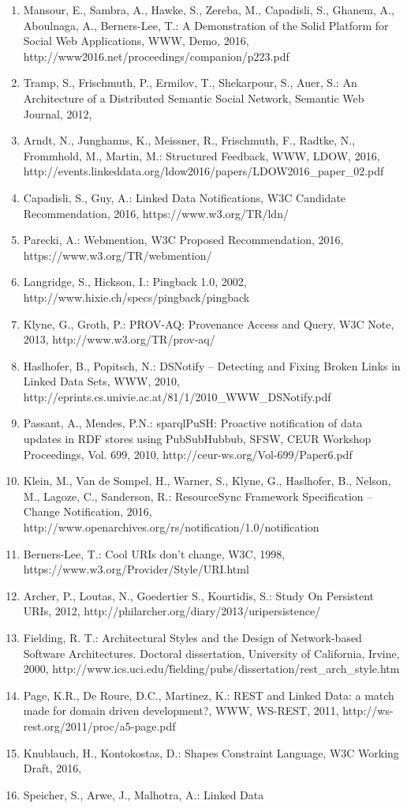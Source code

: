 \documentclass[a4paper]{llncs}
\begin{document}
                        
                            \begin{enumerate}
  \item Mansour, E., Sambra, A., Hawke, S., Zereba, M., Capadisli, S., Ghanem, A., Aboulnaga, A., Berners-Lee, T.: A Demonstration of the Solid Platform for Social Web Applications, WWW, Demo, 2016, \empty http://www2016.net/proceedings/companion/p223.pdf\item Tramp, S., Frischmuth, P., Ermilov, T., Shekarpour, S., Auer, S.: An Architecture of a Distributed Semantic Social Network, Semantic Web Journal, 2012, \empty \item Arndt, N., Junghanns, K., Meissner, R., Frischmuth, F., Radtke, N., Frommhold, M., Martin, M.: Structured Feedback, WWW, LDOW, 2016, \empty http://events.linkeddata.org/ldow2016/papers/LDOW2016\_paper\_02.pdf\item Capadisli, S., Guy, A.: Linked Data Notifications, W3C Candidate Recommendation, 2016, \empty https://www.w3.org/TR/ldn/\item Parecki, A.: Webmention, W3C Proposed Recommendation, 2016, \empty https://www.w3.org/TR/webmention/\item Langridge, S., Hickson, I.: Pingback 1.0, 2002, \empty http://www.hixie.ch/specs/pingback/pingback\item Klyne, G., Groth, P.: PROV-AQ: Provenance Access and Query,  W3C Note, 2013, \empty http://www.w3.org/TR/prov-aq/\item Haslhofer, B., Popitsch, N.: DSNotify – Detecting and Fixing Broken Links in Linked Data Sets, WWW, 2010, \empty http://eprints.cs.univie.ac.at/81/1/2010\_WWW\_DSNotify.pdf\item Passant, A., Mendes, P.N.: sparqlPuSH: Proactive notification of data updates in RDF stores using PubSubHubbub, SFSW, CEUR Workshop Proceedings, Vol. 699, 2010, \empty http://ceur-ws.org/Vol-699/Paper6.pdf\item Klein, M., Van de Sompel, H., Warner, S., Klyne, G., Haslhofer, B., Nelson, M., Lagoze, C., Sanderson, R.: ResourceSync Framework Specification – Change Notification, 2016, \empty http://www.openarchives.org/rs/notification/1.0/notification\item Berners-Lee, T.: Cool URIs don't change, W3C, 1998, \empty https://www.w3.org/Provider/Style/URI.html\item Archer, P., Loutas, N., Goedertier S., Kourtidis, S.: Study On Persistent URIs, 2012, \empty http://philarcher.org/diary/2013/uripersistence/\item Fielding, R. T.: Architectural Styles and the Design of Network-based Software Architectures. Doctoral dissertation, University of California, Irvine, 2000, \empty http://www.ics.uci.edu/\~fielding/pubs/dissertation/rest\_arch\_style.htm\item Page, K.R., De Roure, D.C., Martinez, K.: REST and Linked Data: a match made for domain driven development?, WWW, WS-REST, 2011, \empty http://ws-rest.org/2011/proc/a5-page.pdf\item Knublauch, H., Kontokostas, D.: Shapes Constraint Language, W3C Working Draft, 2016, \empty \item Speicher, S., Arwe, J., Malhotra, A.: Linked Data 
\end{enumerate}
\end{document}
